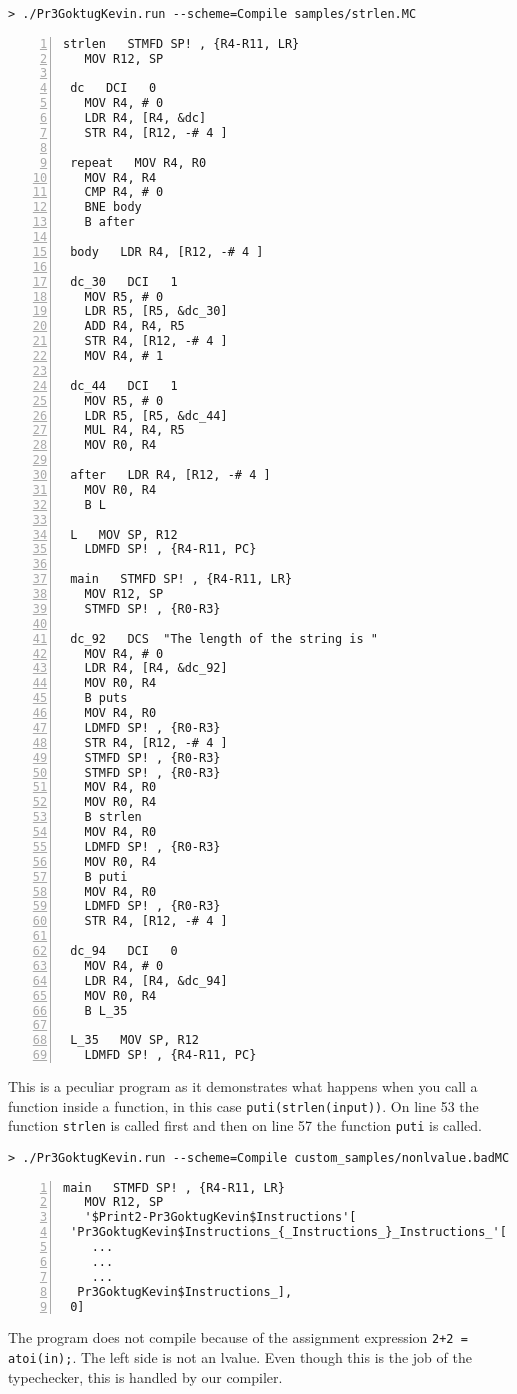 \documentclass{article}
\begin{document}
\begin{verbatim}
> ./Pr3GoktugKevin.run --scheme=Compile samples/strlen.MC
\end{verbatim}
\begin{Verbatim}[numbers=left,xleftmargin=5mm]
 strlen   STMFD SP! , {R4-R11, LR}  
   MOV R12, SP  
   
 dc   DCI   0   
   MOV R4, # 0   
   LDR R4, [R4, &dc]  
   STR R4, [R12, -# 4 ]  
   
 repeat   MOV R4, R0  
   MOV R4, R4  
   CMP R4, # 0   
   BNE body  
   B after  
   
 body   LDR R4, [R12, -# 4 ]  
   
 dc_30   DCI   1   
   MOV R5, # 0   
   LDR R5, [R5, &dc_30]  
   ADD R4, R4, R5  
   STR R4, [R12, -# 4 ]  
   MOV R4, # 1   
   
 dc_44   DCI   1   
   MOV R5, # 0   
   LDR R5, [R5, &dc_44]  
   MUL R4, R4, R5  
   MOV R0, R4  
   
 after   LDR R4, [R12, -# 4 ]  
   MOV R0, R4  
   B L  
   
 L   MOV SP, R12  
   LDMFD SP! , {R4-R11, PC}  
   
 main   STMFD SP! , {R4-R11, LR}  
   MOV R12, SP  
   STMFD SP! , {R0-R3}  
   
 dc_92   DCS  "The length of the string is "  
   MOV R4, # 0   
   LDR R4, [R4, &dc_92]  
   MOV R0, R4  
   B puts  
   MOV R4, R0  
   LDMFD SP! , {R0-R3}  
   STR R4, [R12, -# 4 ]  
   STMFD SP! , {R0-R3}  
   STMFD SP! , {R0-R3}  
   MOV R4, R0  
   MOV R0, R4  
   B strlen  
   MOV R4, R0  
   LDMFD SP! , {R0-R3}  
   MOV R0, R4  
   B puti  
   MOV R4, R0  
   LDMFD SP! , {R0-R3}  
   STR R4, [R12, -# 4 ]  
   
 dc_94   DCI   0   
   MOV R4, # 0   
   LDR R4, [R4, &dc_94]  
   MOV R0, R4  
   B L_35  
   
 L_35   MOV SP, R12  
   LDMFD SP! , {R4-R11, PC}

\end{Verbatim}
This is a peculiar program as it demonstrates what happens when you call a function inside a function, in this case \verb|puti(strlen(input))|. On line 53 the function \verb|strlen| is called first and then on line 57 the function \verb|puti| is called.

\begin{verbatim}
> ./Pr3GoktugKevin.run --scheme=Compile custom_samples/nonlvalue.badMC
\end{verbatim}
\begin{Verbatim}[numbers=left,xleftmargin=5mm]
main   STMFD SP! , {R4-R11, LR}  
   MOV R12, SP  
   '$Print2-Pr3GoktugKevin$Instructions'[
 'Pr3GoktugKevin$Instructions_{_Instructions_}_Instructions_'[
    ...
    ...
    ...
  Pr3GoktugKevin$Instructions_],
 0] 
\end{Verbatim}
The program does not compile because of the assignment expression \verb|2+2 = atoi(in);|. The left side is not an lvalue. Even though this is the job of the typechecker, this is handled by our compiler.
\end{document}
